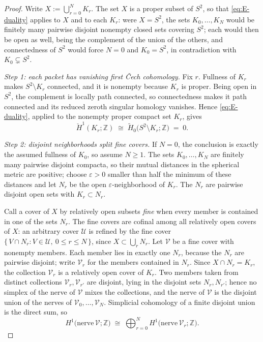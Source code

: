 \documentclass[11pt,reqno]{amsart}
\theoremstyle{definition}
\theoremstyle{remark}
\newcommand{\Z}{\mathbb Z}
\begin{document}
\begin{proof}
Write $X:=\bigcup_{r=0}^{N}K_r$.  The set $X$ is a proper subset of
$S^2$, so that \eqref{eq:E-duality} applies to $X$ and to each $K_r$: were $X=S^2$,
the sets $K_0,\dots,K_N$ would be finitely many pairwise disjoint nonempty closed
sets covering $S^2$; each would then be open as well, being the complement of the
union of the others, and connectedness of $S^2$ would force $N=0$ and $K_0=S^2$, in
contradiction with $K_0\subsetneq S^2$.

\emph{Step 1: each packet has vanishing first \v{C}ech cohomology.}
Fix $r$. Fullness of $K_r$ makes $S^2\setminus K_r$ connected, and it is nonempty
because $K_r$ is proper. Being open in $S^2$, the complement is locally path
connected, so connectedness makes it path connected and its reduced zeroth singular
homology vanishes. Hence \eqref{eq:E-duality}, applied to the nonempty proper
compact set $K_r$, gives
\[
\check H^1(K_r;\Z)\;\cong\;\widetilde H_0\bigl(S^2\setminus K_r;\Z\bigr)\;=\;0 .
\]

\emph{Step 2: disjoint neighborhoods split fine covers.}
If $N=0$, the conclusion is exactly the assumed fullness of $K_0$, so
assume $N\ge1$.
The sets $K_0,\dots,K_N$ are finitely many pairwise disjoint compacta, so their
mutual distances in the spherical metric are positive; choose $\varepsilon>0$ smaller
than half the minimum of these distances and let $N_r$ be the open
$\varepsilon$-neighborhood of $K_r$. The $N_r$ are pairwise disjoint open sets with
$K_r\subset N_r$.

Call a cover of $X$ by relatively open subsets \emph{fine} when every member is
contained in one of the sets $N_r$. The fine covers are cofinal among all relatively
open covers of $X$: an arbitrary cover $\mathcal U$ is refined by the fine cover
$\{\,V\cap N_r : V\in\mathcal U,\ 0\le r\le N\,\}$, since
$X\subset\bigcup_rN_r$. Let $\mathcal V$ be a fine cover with nonempty members. Each
member lies in exactly one $N_r$, because the $N_r$ are pairwise disjoint; write
$\mathcal V_r$ for the members contained in $N_r$. Since
$X\cap N_r=K_r$, the collection $\mathcal V_r$ is a relatively open cover of $K_r$.
Two members taken from distinct collections $\mathcal V_r,\mathcal V_{r'}$ are
disjoint, lying in the disjoint sets $N_r,N_{r'}$; hence no simplex of the nerve of
$\mathcal V$ mixes the collections, and the nerve of $\mathcal V$ is the disjoint
union of the nerves of $\mathcal V_0,\dots,\mathcal V_N$. Simplicial cohomology of a
finite disjoint union is the direct sum, so
\[
H^1\bigl(\mathrm{nerve}\,\mathcal V;\Z\bigr)\;\cong\;
\bigoplus_{r=0}^{N}H^1\bigl(\mathrm{nerve}\,\mathcal V_r;\Z\bigr).
\]


\end{proof}
\end{document}
